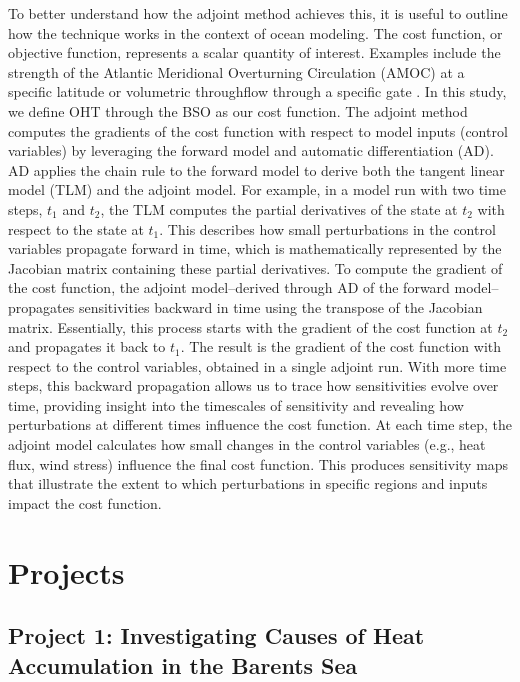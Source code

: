\documentclass[draft]{agujournal2019}
\begin{document}
To better understand how the adjoint method achieves this, it is useful to outline how the technique works in the context of ocean modeling. The cost function, or objective function, represents a scalar quantity of interest. Examples include the strength of the Atlantic Meridional Overturning Circulation (AMOC) at a specific latitude \cite{Pillar2016,Smith2019} or volumetric throughflow through a specific gate \cite{Nguyen2020}. In this study, we define OHT through the BSO as our cost function. The adjoint method computes the gradients of the cost function with respect to model inputs (control variables) by leveraging the forward model and automatic differentiation (AD). AD applies the chain rule to the forward model to derive both the tangent linear model (TLM) and the adjoint model. For example, in a model run with two time steps, $t_1$ and $t_2$, the TLM computes the partial derivatives of the state at $t_2$ with respect to the state at $t_1$. This describes how small perturbations in the control variables propagate forward in time, which is mathematically represented by the Jacobian matrix containing these partial derivatives. To compute the gradient of the cost function, the adjoint model--derived through AD of the forward model--propagates sensitivities backward in time using the transpose of the Jacobian matrix. Essentially, this process starts with the gradient of the cost function at $t_2$ and propagates it back to $t_1$. The result is the gradient of the cost function with respect to the control variables, obtained in a single adjoint run. With more time steps, this backward propagation allows us to trace how sensitivities evolve over time, providing insight into the timescales of sensitivity and revealing how perturbations at different times influence the cost function. At each time step, the adjoint model calculates how small changes in the control variables (e.g., heat flux, wind stress) influence the final cost function. This produces sensitivity maps that illustrate the extent to which perturbations in specific regions and inputs impact the cost function. 

\section{Projects}

\subsection{Project 1: Investigating Causes of Heat Accumulation in the Barents Sea}
\end{document}
